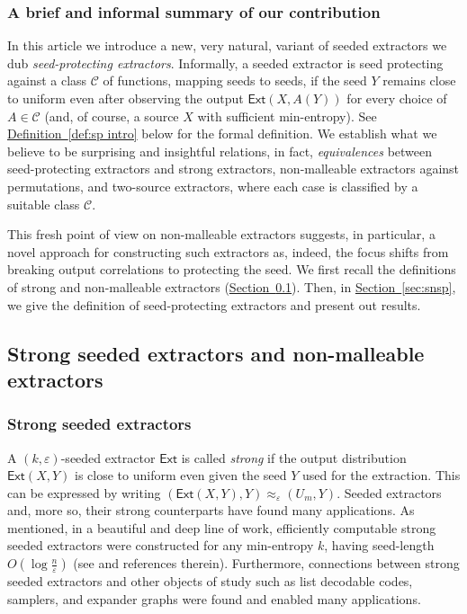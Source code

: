 \documentclass[11pt]{article}
\numberwithin{equation}{section}
\theoremstyle{definition}
\theoremstyle{plain}
\newcommand{\expref}[2]{\hyperref[#2]{#1~\ref{#2}}}
\newcommand{\ccc}{\mathcal{C}}
\newcommand{\ext}{\mathsf{Ext}}
\newcommand{\adv}{A}
\newcommand{\eps}{\varepsilon}
\begin{document}
\subsubsection*{A brief and informal summary of our contribution}
%

In this %
article  %
we introduce a new, very natural, variant of seeded extractors we dub \emph{seed-protecting extractors}. Informally, a seeded extractor is seed protecting 
against a class %
$\ccc$ of functions,
mapping seeds to seeds, if the seed $Y$ remains close to uniform even after observing the output $\ext(X,\adv(Y))$ for every choice of $\adv \in \ccc$ (and, of course, a source $X$ with sufficient min-entropy). See \expref{Definition}{def:sp intro} below for the formal definition. We establish what we believe to be surprising and insightful relations, in fact, \emph{equivalences} between seed-protecting extractors and strong extractors, non-malleable extractors against permutations, and two-source extractors, where each case is classified by a suitable class $\ccc$. 
 
 This fresh point of view on non-malleable extractors suggests, in particular, a novel approach for constructing such extractors as, indeed, the focus shifts from breaking output correlations to protecting the seed.  
%
 We first recall the definitions of strong and non-malleable extractors (\expref{Section}{sec:strong and nm}). Then, in \expref{Section}{sec:snsp}, we give the definition of seed-protecting extractors and present out results.

%
%

%

\subsection{Strong seeded extractors and non-malleable extractors}\label{sec:strong and nm}

%
%
\subsubsection{Strong seeded extractors}
%
A $(k,\eps)$-seeded extractor $\ext$ is called \emph{strong} if the output distribution $\ext(X,Y)$ is close to uniform even given the seed $Y$ used for the extraction. This can be expressed by writing
$
(\ext(X,Y),Y) \approx_\eps (U_m,Y).
$
Seeded extractors and, more so, their strong counterparts have found many applications. As mentioned, in a beautiful and deep line of work, efficiently computable strong seeded extractors were constructed for any min-entropy $k$, having seed-length $O(\log\frac{n}{\eps})$ (see \cite{GUV09,DKSS13,TSU12} and references therein). Furthermore,  connections between strong seeded extractors and other objects of study such as list decodable codes, samplers, and expander graphs were found and enabled many applications.%
\end{document}
